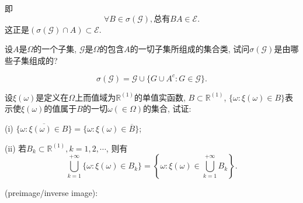 \begin{yyProof}
	即\begin{equation}
	\forall B\in \sigma(\mathscr{G}),\text{总有}BA\in\mathscr{E}.
	\end{equation}
	这正是$ \left(\sigma(\mathscr{G})\cap A\right)\subset \mathscr{E}$.
\end{yyProof}


\begin{yyEx}
	设$A$是$\Omega$的一个子集, $\mathscr{G}$是$\Omega$的包含$A$的一切子集所组成的集合类, 试问$\sigma(\mathscr{G})$是由哪些子集组成的?
\end{yyEx}
\begin{yySolution}
	\begin{equation}
	\sigma(\mathscr{G}) = \mathscr{G}\cup\{ G\cup A^c:G\in\mathscr{G} \}.
	\end{equation}
\end{yySolution}


\begin{yyEx}
	设$\xi(\omega)$是定义在$\Omega$上而值域为$\mathbb{R}^{(1)}$的单值实函数, $B\subset\mathbb{R}^{(1)}$, $\{\omega:\xi(\omega)\in B\}$表示使$\xi(\omega)$的值属于$B$的一切$\omega(\in\Omega)$的集合, 试证:
	\begin{blist}
		\item[(i)] $\overline{\{\omega:\xi(\omega)\in B  \}} = \{ \omega:\xi(\omega)\in\overline{B} \}$;
		\item[(ii)] 若$B_k\subset\mathbb{R}^{(1)},k=1,2,\cdots$, 则有\begin{equation}
		\bigcup_{k=1}^{+\infty}\{\omega:\xi(\omega)\in  B_k\} = \left\{ \omega:\xi(\omega)\in\bigcup_{k=1}^{+\infty}B_k \right\}.
		\end{equation}
	\end{blist}
\end{yyEx}

(preimage/inverse image):

